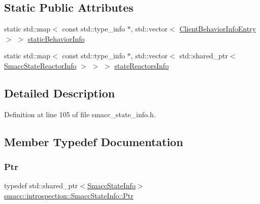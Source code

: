 \subsection*{Static Public Attributes}
\begin{DoxyCompactItemize}
\item 
static std\+::map$<$ const std\+::type\+\_\+info $\ast$, std\+::vector$<$ \hyperlink{structsmacc_1_1introspection_1_1ClientBehaviorInfoEntry}{Client\+Behavior\+Info\+Entry} $>$ $>$ \hyperlink{classsmacc_1_1introspection_1_1SmaccStateInfo_ad3d8b3450060cb0b91f38fb2fe0a7678}{static\+Behavior\+Info}
\item 
static std\+::map$<$ const std\+::type\+\_\+info $\ast$, std\+::vector$<$ std\+::shared\+\_\+ptr$<$ \hyperlink{structsmacc_1_1introspection_1_1SmaccStateReactorInfo}{Smacc\+State\+Reactor\+Info} $>$ $>$ $>$ \hyperlink{classsmacc_1_1introspection_1_1SmaccStateInfo_abd1d6ca5060c87f6bd11fde3e5b2ac4d}{state\+Reactors\+Info}
\end{DoxyCompactItemize}


\subsection{Detailed Description}


Definition at line 105 of file smacc\+\_\+state\+\_\+info.\+h.



\subsection{Member Typedef Documentation}
\mbox{\label{classsmacc_1_1introspection_1_1SmaccStateInfo_a374ef2022bca958ab14469931fc4dcc1}} 
\subsubsection{\texorpdfstring{Ptr}{Ptr}}
{\footnotesize\ttfamily typedef std\+::shared\+\_\+ptr$<$\hyperlink{classsmacc_1_1introspection_1_1SmaccStateInfo}{Smacc\+State\+Info}$>$ \hyperlink{classsmacc_1_1introspection_1_1SmaccStateInfo_a374ef2022bca958ab14469931fc4dcc1}{smacc\+::introspection\+::\+Smacc\+State\+Info\+::\+Ptr}}



